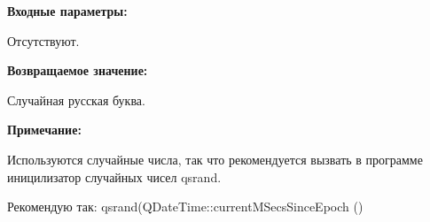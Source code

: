 \textbf{Входные параметры:}

Отсутствуют.

\textbf{Возвращаемое значение:}

Случайная русская буква.

\textbf{Примечание:}

Используются случайные числа, так что рекомендуется вызвать в программе иницилизатор случайных чисел qsrand.

Рекомендую так: qsrand(QDateTime::currentMSecsSinceEpoch () %